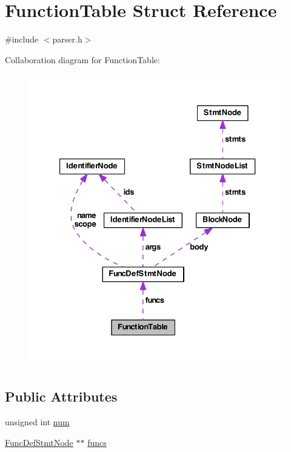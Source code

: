 \hypertarget{struct_function_table}{\section{Function\-Table Struct Reference}
\label{struct_function_table}
}


{\ttfamily \#include $<$parser.\-h$>$}



Collaboration diagram for Function\-Table\-:
\nopagebreak
\begin{figure}[H]
\begin{center}
\leavevmode
\includegraphics[width=329pt]{struct_function_table__coll__graph}
\end{center}
\end{figure}
\subsection*{Public Attributes}
\begin{DoxyCompactItemize}
\item 
unsigned int \hyperlink{struct_function_table_a568ae3641aaf56327da625e668c4aa51}{num}
\item 
\hyperlink{struct_func_def_stmt_node}{Func\-Def\-Stmt\-Node} $\ast$$\ast$ \hyperlink{struct_function_table_a1c1544bb6db2f638619e21fc60ca2ba8}{funcs}
\end{DoxyCompactItemize}


